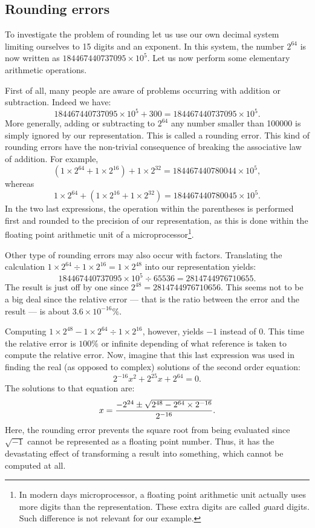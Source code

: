 \subsection{Rounding errors}
\label{sec-rounding} To investigate the problem of rounding let us
use our own decimal system limiting ourselves to 15 digits and an
exponent. In this system, the number $2^{64}$ is now written as
$184467440737095\times10^5$. Let us now perform some elementary
arithmetic operations.
\par
First of all, many people are aware of problems occurring with
addition or subtraction. Indeed we have: $$184467440737095\times
10^5+300 = 184467440737095\times 10^5.$$ More generally, adding or
subtracting to $2^{64}$ any number smaller than 100000 is simply
ignored by our representation. This is called a rounding error.
This kind of rounding errors have the non-trivial consequence of
breaking the associative law of addition. For example, $$\left(1
\times 2^{64}+1 \times 2^{16}\right)+1 \times
2^{32}=184467440780044\times10^5,$$ whereas $$1 \times
2^{64}+\left(1 \times 2^{16}+1 \times
2^{32}\right)=184467440780045\times10^5.$$ In the two last
expressions, the operation within the parentheses is performed
first and rounded to the precision of our representation, as this
is done within the floating point arithmetic unit of a
microprocessor\footnote{In modern days microprocessor, a floating
point arithmetic unit actually uses more digits than the
representation. These extra digits are called {\textsl guard digits}.
Such difference is not relevant for our example.}.
\par
Other type of rounding errors may also occur with factors.
Translating the calculation $1 \times 2^{64} \div 1 \times
2^{16}=1 \times 2^{48}$ into our representation yields:
$$184467440737095\times 10^5 \div 65536 = 2814744976710655.$$ The
result is just off by one since $2^{48} = 2814744976710656$. This
seems not to be a big deal since the relative error --- that is
the ratio between the error and the result --- is about $3.6\times
10^{-16}\%$.
\par
Computing $1 \times 2^{48} - 1 \times 2^{64} \div 1 \times
2^{16}$, however, yields $-1$ instead of $0$. This time the
relative error is $100\%$ or infinite depending of what reference
is taken to compute the relative error. Now, imagine that this
last expression was used in finding the real (as opposed to
complex) solutions of the second order equation:
$$2^{-16}x^2+2^{25}x+2^{64}=0.$$ The solutions to that equation
are: $$x={-2^{24}\pm\sqrt{2^{48}-2^{64}\times 2^{-16}}\over
2^{-16}}.$$ Here, the rounding error prevents the square root from
being evaluated since $\sqrt{-1}$ cannot be represented as a
floating point number. Thus, it has the devastating effect of
transforming a result into something, which cannot be computed at
all.

